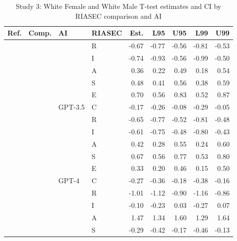 \begin{table}

\caption{Study 3: White Female and White Male T-test estimates and CI by RIASEC comparison and AI}
\centering
\fontsize{8}{10}\selectfont
\begin{tabular}[t]{llllrrrrr}
\toprule
Ref. & Comp. & AI & RIASEC & Est. & L95 & U95 & L99 & U99\\
\midrule
 &  &  & R & -0.67 & -0.77 & -0.56 & -0.81 & -0.53\\

 &  &  & I & -0.74 & -0.93 & -0.56 & -0.99 & -0.50\\

 &  &  & A & 0.36 & 0.22 & 0.49 & 0.18 & 0.54\\

 &  &  & S & 0.48 & 0.41 & 0.56 & 0.38 & 0.59\\

 &  &  & E & 0.70 & 0.56 & 0.83 & 0.52 & 0.87\\

 &  & \multirow[t]{-6}{*}{\raggedright\arraybackslash GPT-3.5} & C & -0.17 & -0.26 & -0.08 & -0.29 & -0.05\\

 &  &  & R & -0.65 & -0.77 & -0.52 & -0.81 & -0.48\\

 &  &  & I & -0.61 & -0.75 & -0.48 & -0.80 & -0.43\\

 &  &  & A & 0.42 & 0.28 & 0.55 & 0.24 & 0.60\\

 &  &  & S & 0.67 & 0.56 & 0.77 & 0.53 & 0.80\\

 &  &  & E & 0.33 & 0.20 & 0.46 & 0.15 & 0.50\\

 &  & \multirow[t]{-6}{*}{\raggedright\arraybackslash GPT-4} & C & -0.27 & -0.36 & -0.18 & -0.38 & -0.16\\

 &  &  & R & -1.01 & -1.12 & -0.90 & -1.16 & -0.86\\

 &  &  & I & -0.10 & -0.23 & 0.03 & -0.27 & 0.07\\

 &  &  & A & 1.47 & 1.34 & 1.60 & 1.29 & 1.64\\

 &  &  & S & -0.29 & -0.42 & -0.17 & -0.46 & -0.13\\


\end{tabular}
\end{table}
